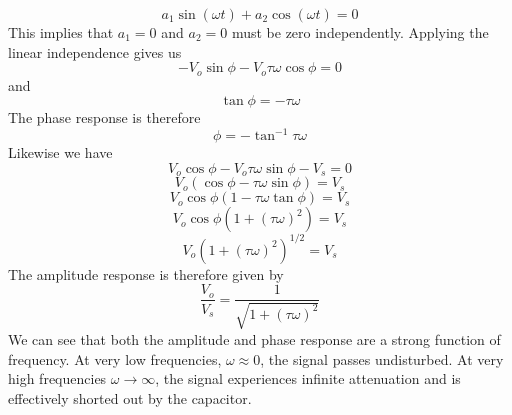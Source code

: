     \begin{equation}
        a_1 \sin(\omega t) + a_2 \cos(\omega t) = 0
    \end{equation}
This implies that $a_1 = 0$ and $a_2 = 0$ must be zero independently.  Applying the linear independence gives us
    \begin{equation}
        -V_o \sin\phi - V_o \tau \omega \cos \phi = 0
    \end{equation}
and
    \begin{equation}
        \tan \phi = -\tau \omega
    \end{equation}
The phase response is therefore 
    \begin{equation}
        \phi = - \tan^{-1} \tau \omega
    \end{equation}
Likewise we have
    \begin{equation}
        V_o \cos\phi - V_o \tau \omega \sin\phi - V_s = 0
    \end{equation}
    \begin{equation}
        V_o (\cos \phi - \tau \omega \sin\phi) = V_s
    \end{equation}
    \begin{equation}
        V_o \cos \phi (1  - \tau \omega \tan\phi) = V_s
    \end{equation}
    \begin{equation}
        V_o \cos \phi (1  + (\tau \omega)^2 ) = V_s
    \end{equation}
    \begin{equation}
        V_o (1  + (\tau \omega)^2 )^{1/2} = V_s
    \end{equation}
 The amplitude response is therefore given by
    \begin{equation}
        \frac{V_o}{V_s} = \frac{1}{\sqrt{1 + (\tau \omega)^2}}
    \end{equation}
We can see that both the amplitude and phase response are a strong function of frequency.  At very low frequencies, $\omega \approx 0$, the signal passes undisturbed.  At very high frequencies $\omega \rightarrow \infty$, the signal experiences infinite attenuation and is effectively shorted out by the capacitor.
\newpage
